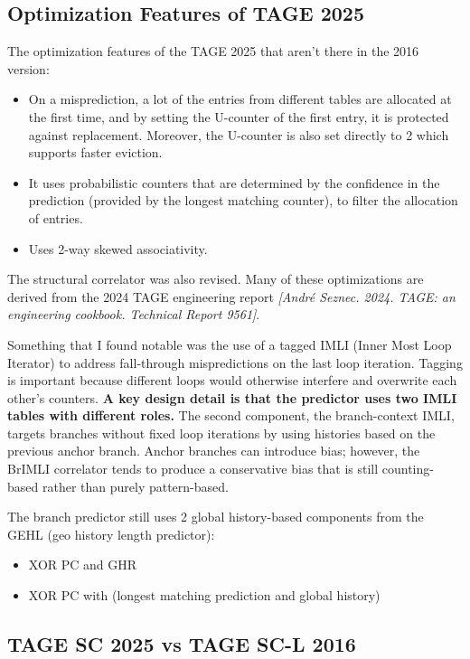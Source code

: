 \documentclass[11pt,a4paper]{article}
\begin{document}
\subsection{Optimization Features of TAGE 2025}
The optimization features of the TAGE 2025 that aren't there in the 2016 version:

\begin{itemize}
    \item On a misprediction, a lot of the entries from different tables are allocated at the first time, and by setting the U-counter of the first entry, it is protected against replacement. Moreover, the U-counter is also set directly to 2 which supports faster eviction.
    \item It uses probabilistic counters that are determined by the confidence in the prediction (provided by the longest matching counter), to filter the allocation of entries.
    \item Uses 2-way skewed associativity.
\end{itemize}

The structural correlator was also revised. Many of these optimizations are derived from the 2024 TAGE engineering report \textit{[André Seznec. 2024. TAGE: an engineering cookbook. Technical Report 9561]}. 

Something that I found notable was the use of a tagged IMLI (Inner Most Loop Iterator) to address fall-through mispredictions on the last loop iteration. Tagging is important because different loops would otherwise interfere and overwrite each other's counters. \textbf{A key design detail is that the predictor uses two IMLI tables with different roles.} The second component, the branch-context IMLI, targets branches without fixed loop iterations by using histories based on the previous anchor branch. Anchor branches can introduce bias; however, the BrIMLI correlator tends to produce a conservative bias that is still counting-based rather than purely pattern-based.

The branch predictor still uses 2 global history-based components from the GEHL (geo history length predictor):
\begin{itemize}
    \item XOR PC and GHR
    \item XOR PC with (longest matching prediction and global history)
\end{itemize}



\subsection{TAGE SC 2025 vs TAGE SC-L 2016}
\end{document}
